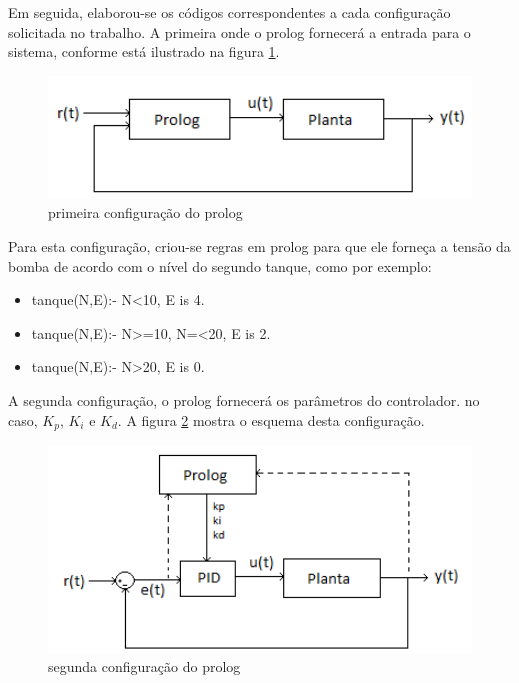 \documentclass[a4paper,12pt]{article}
\begin{document}
Em seguida, elaborou-se os códigos correspondentes a cada configuração
solicitada no trabalho. A primeira onde o prolog fornecerá a entrada para o sistema, conforme está ilustrado na figura \ref{primeira configuracao do prolog}. 

\begin{figure}[ht!]
\caption{primeira configuração do prolog \label{primeira configuracao do prolog}}
\centering
\includegraphics[width=160mm]{Imagens/config1.png}
\end{figure}

Para esta configuração, criou-se regras em prolog para que ele forneça a tensão da bomba de acordo com o nível do segundo tanque, como por exemplo:

\begin{itemize}
\item tanque(N,E):- N<10, E is 4.
\item tanque(N,E):- N>=10, N=<20, E is 2.
\item tanque(N,E):- N>20, E is 0.
\end{itemize}

A segunda configuração, o prolog fornecerá os parâmetros do controlador. no caso, $K_p$, $K_i$ e $K_d$. A figura \ref{segunda configuracao do prolog} mostra o esquema desta configuração.

\newpage

\begin{figure}[ht!]
\caption{segunda configuração do prolog \label{segunda configuracao do prolog}}
\centering
\includegraphics[width=160mm]{Imagens/confg2.png}
\end{figure}
\end{document}
